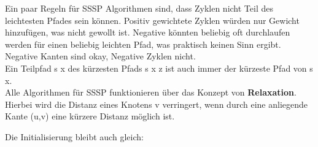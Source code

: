 \documentclass[
../../AuD-Zusammenfassung.tex,
]
{subfiles}
\begin{document}
Ein paar Regeln für SSSP Algorithmen sind, dass Zyklen nicht Teil des leichtesten Pfades sein können. Positiv gewichtete Zyklen würden nur Gewicht hinzufügen, was nicht gewollt ist. Negative könnten beliebig oft durchlaufen werden für einen beliebig leichten Pfad, was praktisch keinen Sinn ergibt. Negative Kanten sind okay, Negative Zyklen nicht.\\
Ein Teilpfad s \rightarrow x des kürzesten Pfads s \rightarrow x \rightarrow z ist auch immer der kürzeste Pfad von s \rightarrow x.\\
Alle Algorithmen für SSSP funktionieren über das Konzept von \textbf{Relaxation}. Hierbei wird die Distanz eines Knotens v verringert, wenn durch eine anliegende Kante (u,v) eine kürzere Distanz möglich ist. \\
\begin{algorithm}[H]
\end{algorithm}
Die Initialisierung bleibt auch gleich:\\
\begin{algorithm}[H]
\end{algorithm}
\newpage
\end{document}
